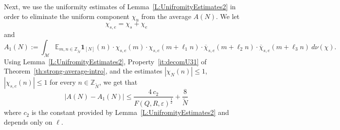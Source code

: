 \documentclass[11pt]{amsart}
\theoremstyle{definition}
\begin{document}
Next, we  use the uniformity estimates of
Lemma~\ref{L:UnifromityEstimates2} in order to eliminate the uniform
component $\chi_u$ from the average $A(N)$. We let
$$
\chi_{s,e}=\chi_s+\chi_e
$$ and
 $$
A_1(N):=\int_{{\mathcal M}}  {{\mathbb E}}_{m,n\in{{{\mathbb Z}}_{\widetilde N}}} {\mathbf{1}}_{[N]}(n)\cdot\chi_{s,e}(m)\cdot
\chi_{s,e}(m+\ell_1n) \cdot \overline\chi_{s,e}(m+\ell_2n) \cdot
\overline\chi_{s,e}(m+\ell_3n)\ d\nu(\chi). $$
 Using
Lemma~\ref{L:UnifromityEstimates2}, Property~\eqref{it:decomU31} of
Theorem~\ref{th:strong-average-intro}, and the estimates  $|\chi_N(n)|\leq 1$, $|\chi_{s,e}(n)|\leq 1$ for every $n\in{{{\mathbb Z}}_{\widetilde N}}$,
we get that
\begin{equation}\label{E:a1}
|A(N)-A_1(N)|\leq \frac{4\, c_2}{F(Q,R,{\varepsilon})^{\frac{1}{2}}}+\frac{8}{{\widetilde N}}
\end{equation}
where $c_2$ is the constant provided by
Lemma~\ref{L:UnifromityEstimates2} and depends only on $\ell$.
\end{document}

